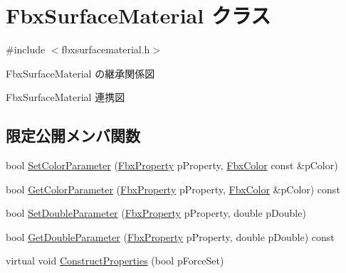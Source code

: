\hypertarget{class_fbx_surface_material}{}\section{Fbx\+Surface\+Material クラス}
\label{class_fbx_surface_material}


{\ttfamily \#include $<$fbxsurfacematerial.\+h$>$}



Fbx\+Surface\+Material の継承関係図


Fbx\+Surface\+Material 連携図
\subsection*{限定公開メンバ関数}
\begin{DoxyCompactItemize}
\item 
bool \hyperlink{class_fbx_surface_material_aecd7c87e5db1902bf2b03834b92d5635}{Set\+Color\+Parameter} (\hyperlink{class_fbx_property}{Fbx\+Property} p\+Property, \hyperlink{class_fbx_color}{Fbx\+Color} const \&p\+Color)
\item 
bool \hyperlink{class_fbx_surface_material_a9c9823b3b0c6d2b6c216c4ca0a12a64d}{Get\+Color\+Parameter} (\hyperlink{class_fbx_property}{Fbx\+Property} p\+Property, \hyperlink{class_fbx_color}{Fbx\+Color} \&p\+Color) const
\item 
bool \hyperlink{class_fbx_surface_material_a5d2b4164f67106f295a456f68b6d3bf2}{Set\+Double\+Parameter} (\hyperlink{class_fbx_property}{Fbx\+Property} p\+Property, double p\+Double)
\item 
bool \hyperlink{class_fbx_surface_material_aa5a97e4e159289d05404b2ad28ed3e31}{Get\+Double\+Parameter} (\hyperlink{class_fbx_property}{Fbx\+Property} p\+Property, double p\+Double) const
\item 
virtual void \hyperlink{class_fbx_surface_material_aafc5d21293bea6b63a6ea96fa9fe0bb2}{Construct\+Properties} (bool p\+Force\+Set)
\end{DoxyCompactItemize}
